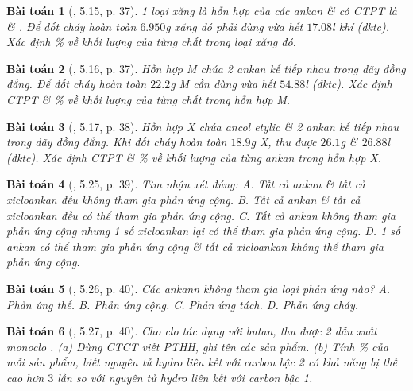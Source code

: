 \documentclass{article}
\newtheorem{baitoan}{Bài toán}
\begin{document}
\begin{baitoan}[\cite{SBT_Hoa_Hoc_11_co_ban}, 5.15, p. 37]
	1 loại xăng là hỗn hợp của các ankan \& có CTPT là \emph{} \& \emph{}. Để đốt cháy hoàn toàn $6.950$\emph{g} xăng đó phải dùng vừa hết $17.08$\emph{l} khí \emph{} (đktc). Xác định \% về khối lượng của từng chất trong loại xăng đó. 
\end{baitoan}

\begin{baitoan}[\cite{SBT_Hoa_Hoc_11_co_ban}, 5.16, p. 37]
	Hỗn hợp M chứa 2 ankan kế tiếp nhau trong dãy đồng đẳng. Để đốt cháy hoàn toàn $22.2$\emph{g} M cần dùng vừa hết $54.88$\emph{l} \emph{} (đktc). Xác định CTPT \& \% về khối lượng của từng chất trong hỗn hợp M.
\end{baitoan}

\begin{baitoan}[\cite{SBT_Hoa_Hoc_11_co_ban}, 5.17, p. 38]
	Hỗn hợp X chứa ancol etylic \emph{} \& 2 ankan kế tiếp nhau trong dãy đồng đẳng. Khi đốt cháy hoàn toàn $18.9$\emph{g} X, thu được $26.1$\emph{g } \& $26.88$\emph{l } (đktc). Xác định CTPT \& \% về khối lượng của từng ankan trong hỗn hợp X.
\end{baitoan}

\begin{baitoan}[\cite{SBT_Hoa_Hoc_11_co_ban}, 5.25, p. 39]
	Tìm nhận xét đúng: {\sf A.} Tất cả ankan \& tất cả xicloankan đều không tham gia phản ứng cộng. {\sf B.} Tất cả ankan \& tất cả xicloankan đều có thể tham gia phản ứng cộng. {\sf C.} Tất cả ankan không tham gia phản ứng cộng nhưng 1 số xicloankan lại có thể tham gia phản ứng cộng. {\sf D.} 1 số ankan có thể tham gia phản ứng cộng \& tất cả xicloankan không thể tham gia phản ứng cộng.
\end{baitoan}

\begin{baitoan}[\cite{SBT_Hoa_Hoc_11_co_ban}, 5.26, p. 40]
	Các ankann không tham gia loại phản ứng nào? {\sf A.} Phản ứng thế. {\sf B.} Phản ứng cộng. {\sf C.} Phản ứng tách. {\sf D.} Phản ứng cháy.
\end{baitoan}

\begin{baitoan}[\cite{SBT_Hoa_Hoc_11_co_ban}, 5.27, p. 40]
	Cho clo tác dụng với butan, thu được 2 dẫn xuất monoclo \emph{}. (a) Dùng CTCT viết PTHH, ghi tên các sản phẩm. (b) Tính \% của mỗi sản phẩm, biết nguyên tử hydro liên kết với carbon bậc 2 có khả năng bị thế cao hơn $3$ lần so với nguyên tử hydro liên kết với carbon bậc 1.
\end{baitoan}
\end{document}
